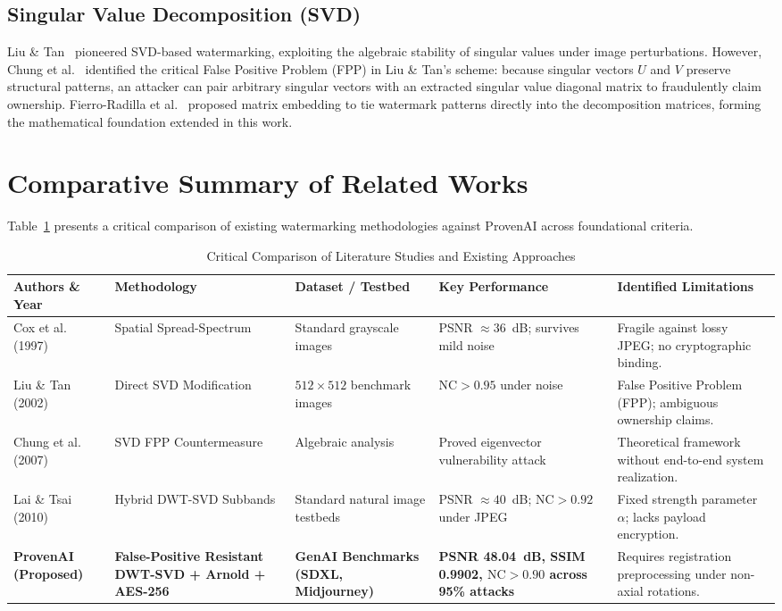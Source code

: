 \documentclass[12pt,a4paper]{report}
\begin{document}
\subsection{Singular Value Decomposition (SVD)}
Liu \& Tan~\cite{liu2002svd} pioneered SVD-based watermarking, exploiting the algebraic stability of singular values under image perturbations. However, Chung et al.~\cite{chung2007false} identified the critical False Positive Problem (FPP) in Liu \& Tan's scheme: because singular vectors $U$ and $V$ preserve structural patterns, an attacker can pair arbitrary singular vectors with an extracted singular value diagonal matrix to fraudulently claim ownership. Fierro-Radilla et al.~\cite{fierro2019optimized} proposed matrix embedding to tie watermark patterns directly into the decomposition matrices, forming the mathematical foundation extended in this work.

\section{Comparative Summary of Related Works}
Table~\ref{tab:lit_comparison} presents a critical comparison of existing watermarking methodologies against ProvenAI across foundational criteria.

\begin{table}[htbp]
\centering
\small
\caption{Critical Comparison of Literature Studies and Existing Approaches}
\label{tab:lit_comparison}
\begin{tabularx}{\textwidth}{p{3.2cm}p{3.0cm}p{2.6cm}p{3.0cm}X}
\toprule
\textbf{Authors \& Year} & \textbf{Methodology} & \textbf{Dataset / Testbed} & \textbf{Key Performance} & \textbf{Identified Limitations} \\
\midrule
Cox et al. (1997)~\cite{cox2002digital} & Spatial Spread-Spectrum & Standard grayscale images & PSNR $\approx 36$~dB; survives mild noise & Fragile against lossy JPEG; no cryptographic binding. \\
\addlinespace
Liu \& Tan (2002)~\cite{liu2002svd} & Direct SVD Modification & $512 \times 512$ benchmark images & $\text{NC} > 0.95$ under noise & False Positive Problem (FPP); ambiguous ownership claims. \\
\addlinespace
Chung et al. (2007)~\cite{chung2007false} & SVD FPP Countermeasure & Algebraic analysis & Proved eigenvector vulnerability attack & Theoretical framework without end-to-end system realization. \\
\addlinespace
Lai \& Tsai (2010)~\cite{lai2010digital} & Hybrid DWT-SVD Subbands & Standard natural image testbeds & PSNR $\approx 40$~dB; $\text{NC} > 0.92$ under JPEG & Fixed strength parameter $\alpha$; lacks payload encryption. \\
\addlinespace
\textbf{ProvenAI (Proposed)} & \textbf{False-Positive Resistant DWT-SVD + Arnold + AES-256} & \textbf{GenAI Benchmarks (SDXL, Midjourney)} & \textbf{PSNR 48.04~dB, SSIM 0.9902, $\text{NC} > 0.90$ across 95\% attacks} & Requires registration preprocessing under non-axial rotations. \\
\bottomrule
\end{tabularx}
\end{table}
\end{document}
